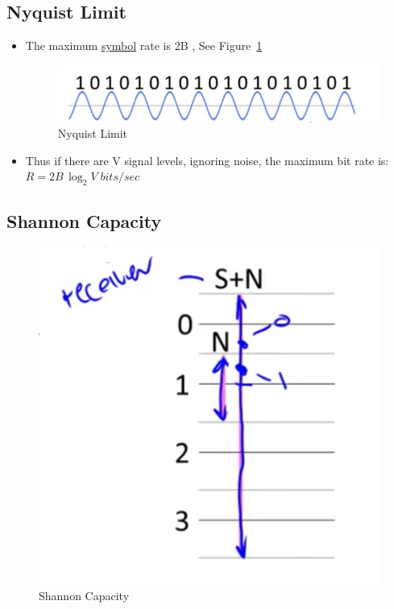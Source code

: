 \documentclass[12pt]{ctexart}   %
\begin{document}
	\subsection{Nyquist Limit}
	\begin{itemize}
		\item The maximum \underline{symbol} rate is 2B , See Figure~\ref{fig:2-5-2}
		 \begin{figure}[h!] %
		 \centering
		 \includegraphics[scale=0.7]{images/2-5-2}
		\caption{ Nyquist Limit}
		 \label{fig:2-5-2}
		 \end{figure}
		 
		 \item Thus if there are V signal levels, ignoring noise, the maximum bit rate is: $R = 2B\, \log_2 V \; bits/sec$
	\end{itemize}
	
	\subsection{Shannon Capacity}
	
	\begin{figure}[h!] %
	 \centering
	 \includegraphics[scale=0.7]{images/2-5-3}
	\caption{ Shannon Capacity}
	 \label{fig:2-5-3}
	 \end{figure}
	
\end{document}
